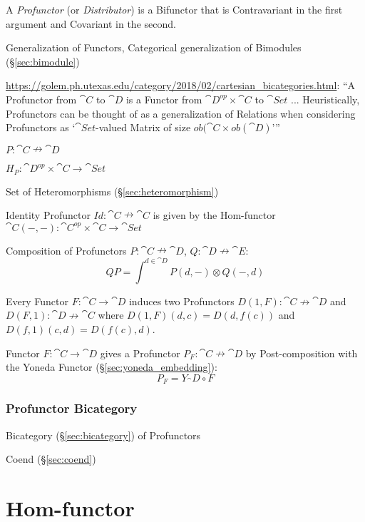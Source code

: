 A \emph{Profunctor} (or \emph{Distributor}) is a Bifunctor that is
Contravariant in the first argument and Covariant in the second.

Generalization of Functors, Categorical generalization of Bimodules
(\S\ref{sec:bimodule})

\url{https://golem.ph.utexas.edu/category/2018/02/cartesian_bicategories.html}:
``A Profunctor from $\cat{C}$ to $\cat{D}$ is a Functor from $\cat{D}^{op}
\times \cat{C}$ to $\cat{Set}$ ... Heuristically, Profunctors can be thought of
as a generalization of Relations when considering Profunctors as
`$\cat{Set}$-valued Matrix of size $ob(\cat{C} \times ob(\cat{D})$'''

$P : \cat{C} \nrightarrow \cat{D}$

$H_P : \cat{D}^{op} \times \cat{C} \rightarrow \cat{Set}$

Set of Heteromorphisms (\S\ref{sec:heteromorphism})

Identity Profunctor $Id : \cat{C} \nrightarrow \cat{C}$ is given by
the Hom-functor $\cat{C}(-,-) : \cat{C}^{op} \times \cat{C}
\rightarrow \cat{Set}$

Composition of Profunctors $P : \cat{C} \nrightarrow \cat{D}$, $Q :
\cat{D} \nrightarrow \cat{E}$:
\[
  Q P = \int^{d \in \cat{D}} P(d,-) \otimes Q(-,d)
\]

Every Functor $F : \cat{C} \rightarrow \cat{D}$ induces two
Profunctors $D(1,F) : \cat{C} \nrightarrow \cat{D}$ and $D(F,1)
: \cat{D} \nrightarrow \cat{C}$ where $D(1,F)(d,c) = D(d,f(c))$
and $D(f,1)(c,d) = D(f(c),d)$.

Functor $F : \cat{C} \rightarrow \cat{D}$ gives a Profunctor $P_F :
\cat{C} \nrightarrow \cat{D}$ by Post-composition with the Yoneda
Functor (\S\ref{sec:yoneda_embedding}):
\[
  P_F = Y_\cat{D} \circ F
\]



\subsubsection{Profunctor Bicategory}\label{sec:profunctor_bicategory}

Bicategory (\S\ref{sec:bicategory}) of Profunctors

Coend (\S\ref{sec:coend})



\section{Hom-functor}\label{sec:hom_functor}


